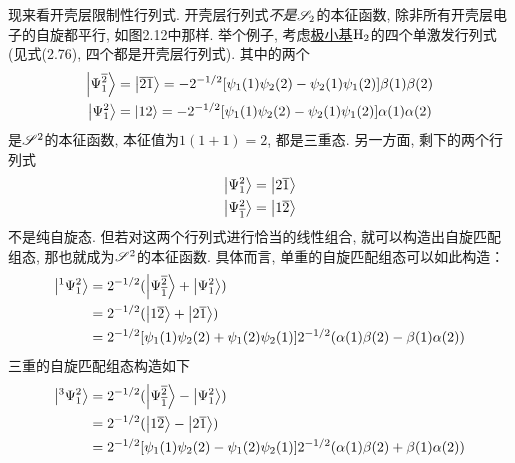 现来看开壳层限制性行列式. 开壳层行列式\emph{不是}$\mathscr{S}_2$的本征函数, 除非所有开壳层电子的自旋都平行, 如图2.12中那样. 举个例子, 考虑\underline{极小基$\mathrm{H}_2$}的四个单激发行列式(见式(2.76), 四个都是开壳层行列式). 其中的两个
\begin{subequations}
	\begin{align}
	\Ket{\Psi_1^{\overline{2}}} & = \Ket{\overline{2}\overline{1}} = -2^{-1/2}[\psi_1(1)\psi_2(2) - \psi_2(1)\psi_1(2)]\beta(1)\beta(2)\\
	\Ket{\Psi_1^{{2}}} & = \Ket{12}  = -2^{-1/2}[\psi_1(1)\psi_2(2) - \psi_2(1)\psi_1(2)]\alpha(1)\alpha(2)\\
	\end{align}
\end{subequations} 
是$\mathscr{S}^2$的本征函数, 本征值为$1(1+1)=2$, 都是三重态. 另一方面, 剩下的两个行列式
\begin{subequations}
	\begin{align}
	\Ket{\Psi_1^2} & = \Ket{2\overline{1}}\\
	\Ket{\Psi_{\overline{1}}^{2}} & = \Ket{1\overline{2}}
	\end{align}
\end{subequations} 
不是纯自旋态. 但若对这两个行列式进行恰当的线性组合, 就可以构造出自旋匹配组态, 那也就成为$\mathscr{S}^2$的本征函数. 具体而言, 单重的自旋匹配组态可以如此构造：
\begin{align}
\Ket{^1\Psi_1^2} & = 2^{-1/2}(\Ket{\Psi_{\overline{1}}^{\overline{2}}} + \Ket{\Psi_1^2}) \notag\\
& =2^{-1/2}(\Ket{1\overline{2}} + \Ket{2\overline{1}})\notag \\
& =2^{-1/2}[ \psi_1(1)\psi_2(2) + \psi_1(2)\psi_2(1)] 2^{-1/2}(\alpha(1)\beta(2) - \beta(1)\alpha(2))
\end{align}
三重的自旋匹配组态构造如下
\begin{align}
\Ket{^3\Psi_1^2} & = 2^{-1/2}(\Ket{\Psi_{\overline{1}}^{\overline{2}}} - \Ket{\Psi_1^2}) \notag\\
& =2^{-1/2}(\Ket{1\overline{2}} - \Ket{2\overline{1}})\notag \\
& =2^{-1/2}[ \psi_1(1)\psi_2(2) - \psi_1(2)\psi_2(1)] 2^{-1/2}(\alpha(1)\beta(2) + \beta(1)\alpha(2))
\end{align}

